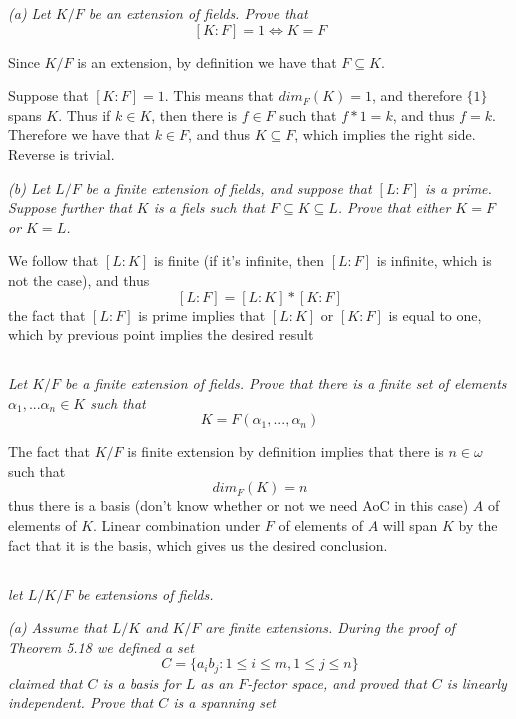 \documentclass[11pt,oneside,titlepage]{book}
\DeclareMathOperator \lra {\Leftrightarrow}
\newcommand{\set}[1]{\{ #1 \}}
\begin{document}
\textit{(a) Let $K/F$ be an extension of fields. Prove that
  $$[K:F] = 1 \lra K = F$$
}

Since $K/F$ is an extension, by definition we have that $F \subseteq
K$.

Suppose that $[K:F] = 1$. This means that $dim_F(K) = 1$, and
therefore $\set{1}$ spans $K$. Thus if $k \in K$, then there is $f \in
F$ such that $f * 1 = k$, and thus $f = k$. Therefore we have that $k
\in F$, and thus $K \subseteq F$, which implies the right
side. Reverse is trivial.

\textit{(b) Let $L/F$ be a finite extension of fields, and suppose
that $[L:F]$ is a prime. Suppose further that $K$ is a fiels such that
$F \subseteq K \subseteq L$. Prove that either $K = F$ or $K = L$.}

We follow that $[L:K]$ is finite (if it's infinite, then $[L:F]$
is infinite, which is not the case), and thus
$$[L:F] = [L:K] * [K:F]$$
the fact that $[L:F]$ is prime implies that $[L:K]$ or $[K:F]$
is equal to one, which by previous point implies the desired result

\subsection{}

\textit{Let $K/F$ be a finite extension of fields. Prove that there is a
  finite set of elements $\alpha_1, ... \alpha_n \in K$ such that
  $$K = F(\alpha_1, ..., \alpha_n)$$
}

The fact that $K/F$ is finite extension by definition implies that
there is $n \in \omega$ such that
$$dim_F(K) = n$$
thus there is a basis (don't know whether or not we need AoC in this
case) $A$ of elements of $K$. Linear combination under $F$ of elements
of $A$ will span $K$ by the fact that it is the basis, which
gives us the desired conclusion.

\subsection{}

\textit{let $L/K/F$ be extensions of fields.}

\textit{(a) Assume that $L/K$ and $K/F$ are finite extensions. During
the proof of Theorem 5.18 we defined a set
  $$C = \set{a_i b_j: 1 \leq i \leq m, 1 \leq j \leq n}$$
  claimed that $C$ is a basis for $L$ as an $F$-fector space, and
  proved that $C$ is linearly independent. Prove that $C$ is a spanning
  set}
\end{document}
